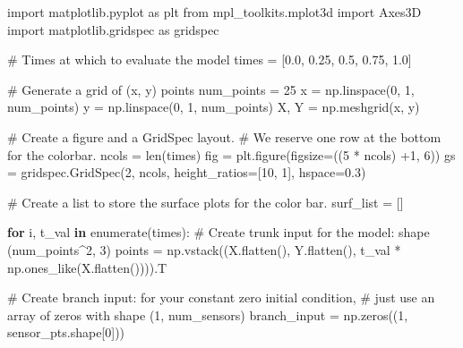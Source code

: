 \documentclass[
  spanish,
  us-letterpaper,
  DIV=11,
  numbers=noendperiod]{scrreprt}
\newenvironment{Shaded}{\begin{snugshade}}{\end{snugshade}}
\newcommand{\BuiltInTok}[1]{\textcolor[rgb]{0.00,0.23,0.31}{#1}}
\newcommand{\CommentTok}[1]{\textcolor[rgb]{0.37,0.37,0.37}{#1}}
\newcommand{\ControlFlowTok}[1]{\textcolor[rgb]{0.00,0.23,0.31}{\textbf{#1}}}
\newcommand{\DecValTok}[1]{\textcolor[rgb]{0.68,0.00,0.00}{#1}}
\newcommand{\FloatTok}[1]{\textcolor[rgb]{0.68,0.00,0.00}{#1}}
\newcommand{\ImportTok}[1]{\textcolor[rgb]{0.00,0.46,0.62}{#1}}
\newcommand{\KeywordTok}[1]{\textcolor[rgb]{0.00,0.23,0.31}{\textbf{#1}}}
\newcommand{\NormalTok}[1]{\textcolor[rgb]{0.00,0.23,0.31}{#1}}
\newcommand{\OperatorTok}[1]{\textcolor[rgb]{0.37,0.37,0.37}{#1}}
\begin{document}
\begin{Shaded}
\begin{Highlighting}[]
\ImportTok{import}\NormalTok{ matplotlib.pyplot }\ImportTok{as}\NormalTok{ plt}
\ImportTok{from}\NormalTok{ mpl\_toolkits.mplot3d }\ImportTok{import}\NormalTok{ Axes3D}
\ImportTok{import}\NormalTok{ matplotlib.gridspec }\ImportTok{as}\NormalTok{ gridspec}

\CommentTok{\# Times at which to evaluate the model}
\NormalTok{times }\OperatorTok{=}\NormalTok{ [}\FloatTok{0.0}\NormalTok{, }\FloatTok{0.25}\NormalTok{, }\FloatTok{0.5}\NormalTok{, }\FloatTok{0.75}\NormalTok{, }\FloatTok{1.0}\NormalTok{]}

\CommentTok{\# Generate a grid of (x, y) points}
\NormalTok{num\_points }\OperatorTok{=} \DecValTok{25}
\NormalTok{x }\OperatorTok{=}\NormalTok{ np.linspace(}\DecValTok{0}\NormalTok{, }\DecValTok{1}\NormalTok{, num\_points)}
\NormalTok{y }\OperatorTok{=}\NormalTok{ np.linspace(}\DecValTok{0}\NormalTok{, }\DecValTok{1}\NormalTok{, num\_points)}
\NormalTok{X, Y }\OperatorTok{=}\NormalTok{ np.meshgrid(x, y)}

\CommentTok{\# Create a figure and a GridSpec layout.}
\CommentTok{\# We reserve one row at the bottom for the colorbar.}
\NormalTok{ncols }\OperatorTok{=} \BuiltInTok{len}\NormalTok{(times)}
\NormalTok{fig }\OperatorTok{=}\NormalTok{ plt.figure(figsize}\OperatorTok{=}\NormalTok{((}\DecValTok{5} \OperatorTok{*}\NormalTok{ ncols) }\OperatorTok{+}\DecValTok{1}\NormalTok{, }\DecValTok{6}\NormalTok{))}
\NormalTok{gs }\OperatorTok{=}\NormalTok{ gridspec.GridSpec(}\DecValTok{2}\NormalTok{, ncols, height\_ratios}\OperatorTok{=}\NormalTok{[}\DecValTok{10}\NormalTok{, }\DecValTok{1}\NormalTok{], hspace}\OperatorTok{=}\FloatTok{0.3}\NormalTok{)}

\CommentTok{\# Create a list to store the surface plots for the color bar.}
\NormalTok{surf\_list }\OperatorTok{=}\NormalTok{ []}

\ControlFlowTok{for}\NormalTok{ i, t\_val }\KeywordTok{in} \BuiltInTok{enumerate}\NormalTok{(times):}
    \CommentTok{\# Create trunk input for the model: shape (num\_points\^{}2, 3)}
\NormalTok{    points }\OperatorTok{=}\NormalTok{ np.vstack((X.flatten(), Y.flatten(), t\_val }\OperatorTok{*}\NormalTok{ np.ones\_like(X.flatten()))).T}

    \CommentTok{\# Create branch input: for your constant zero initial condition,}
    \CommentTok{\# just use an array of zeros with shape (1, num\_sensors)}
\NormalTok{    branch\_input }\OperatorTok{=}\NormalTok{ np.zeros((}\DecValTok{1}\NormalTok{, sensor\_pts.shape[}\DecValTok{0}\NormalTok{]))}


\end{Highlighting}
\end{Shaded}
\end{document}
